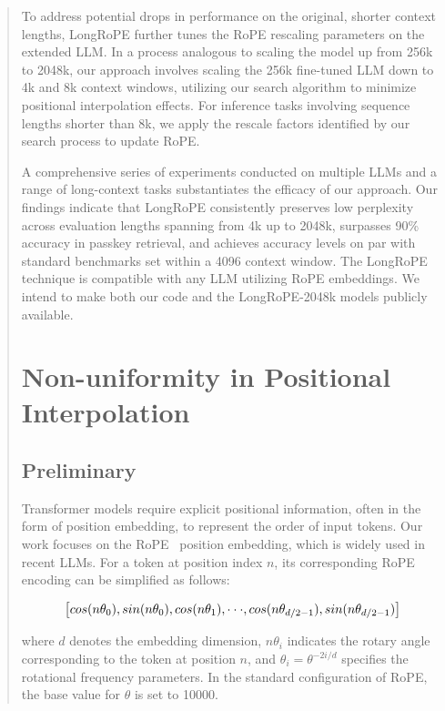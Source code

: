 \begin{abstract}
To address potential drops in performance on the original, shorter context lengths, {LongRoPE} further tunes the RoPE rescaling parameters on the extended LLM. In a process analogous to scaling the model up from 256k to 2048k, our approach involves scaling the 256k fine-tuned LLM down to 4k and 8k context windows, utilizing our search algorithm to minimize positional interpolation effects. For inference tasks involving sequence lengths shorter than 8k, we apply the rescale factors identified by our search process to update RoPE.

A comprehensive series of experiments conducted on multiple LLMs and a range of long-context tasks substantiates the efficacy of our approach. Our findings indicate that LongRoPE consistently preserves low perplexity across evaluation lengths spanning from 4k up to 2048k, surpasses 90\% accuracy in passkey retrieval, and achieves accuracy levels on par with standard benchmarks set within a 4096 context window. The LongRoPE technique is compatible with any LLM utilizing RoPE embeddings. We intend to make both our code and the LongRoPE-2048k models publicly available.

\section{Non-uniformity in Positional Interpolation}
\label{sec:analysis}

\subsection{Preliminary}

Transformer models require explicit positional information, often in the form of position embedding, to represent the order of input tokens. Our work focuses on the RoPE~\cite{rope} position embedding, which is widely used in recent  LLMs. For a token at position index $n$, its corresponding RoPE encoding can be simplified as follows:

\begin{equation}
		\fontsize{7.8}{7.8} \selectfont
	\label{eq:rope}
	\left[ cos(n\theta_0), sin(n\theta_0), cos(n\theta_1), \cdot\cdot\cdot, cos(n\theta_{d/2-1}), sin(n\theta_{d/2-1}) \right]   
\end{equation}

where $d$ denotes the embedding dimension, 
$n\theta_i$ indicates the rotary angle corresponding to the token at position $n$, 
and $\theta_i=\theta^{-2i/d}$ specifies the rotational frequency parameters. In the standard configuration of RoPE, the base value for $\theta$ is set to 10000. 


\end{abstract}

